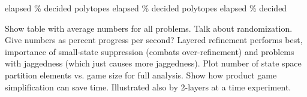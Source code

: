             \bTD  \eTD
        \eTR
        \bTR
            \bTD elapsed \eTD
            \bTD  \eTD
            \bTD  \eTD
            \bTD  \eTD
            \bTD  \eTD
            \bTD  \eTD
        \eTR
        \bTR
            \bTD \% decided \eTD
            \bTD  \eTD
            \bTD  \eTD
            \bTD  \eTD
            \bTD  \eTD
            \bTD  \eTD
        \eTR
        \bTR[topframe=on]
             \eTH
            \bTD polytopes \eTD
            \bTD  \eTD
            \bTD  \eTD
            \bTD  \eTD
            \bTD  \eTD
            \bTD  \eTD
        \eTR
        \bTR
            \bTD elapsed \eTD
            \bTD  \eTD
            \bTD  \eTD
            \bTD  \eTD
            \bTD  \eTD
            \bTD  \eTD
        \eTR
        \bTR
            \bTD \% decided \eTD
            \bTD  \eTD
            \bTD  \eTD
            \bTD  \eTD
            \bTD  \eTD
            \bTD  \eTD
        \eTR
        \bTR[topframe=on]
             \eTH
            \bTD polytopes \eTD
            \bTD  \eTD
            \bTD  \eTD
            \bTD  \eTD
            \bTD  \eTD
            \bTD  \eTD
        \eTR
        \bTR
            \bTD elapsed \eTD
            \bTD  \eTD
            \bTD  \eTD
            \bTD  \eTD
            \bTD  \eTD
            \bTD  \eTD
        \eTR
        \bTR
            \bTD \% decided \eTD
            \bTD  \eTD
            \bTD  \eTD
            \bTD  \eTD
            \bTD  \eTD
            \bTD  \eTD
        \eTR
    \eTABLE
\stopbuffer

\startsubsection[title={Results},reference=sec:cases-integrator-results]


    Show table with average numbers for all problems.
    Talk about randomization.
    Give numbers as percent progress per second?
    Layered refinement performs best, importance of small-state suppression (combats over-refinement) and problems with jaggedness (which just causes more jaggedness).
    Plot number of state space partition elements vs. game size for full analysis.
    Show how product game simplification can save time.
    Illustrated also by 2-layers at a time experiment.

\stopsubsection

